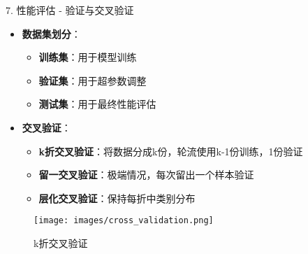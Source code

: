 \documentclass[
  ignorenonframetext,
  aspectratio=169,
  chinese-hans,
]{beamer}
\providecommand{\tightlist}{%
  \setlength{\itemsep}{0pt}\setlength{\parskip}{0pt}}\usepackage{longtable,booktabs,array}
\begin{document}
\begin{frame}{7. 性能评估 - 验证与交叉验证}
\label{ux6027ux80fdux8bc4ux4f30---ux9a8cux8bc1ux4e0eux4ea4ux53c9ux9a8cux8bc1}
\begin{itemize}
\tightlist
\item
  \textbf{数据集划分}：

  \begin{itemize}
  \tightlist
  \item
    \textbf{训练集}：用于模型训练
  \item
    \textbf{验证集}：用于超参数调整
  \item
    \textbf{测试集}：用于最终性能评估
  \end{itemize}
\item
  \textbf{交叉验证}：

  \begin{itemize}
  \tightlist
  \item
    \textbf{k折交叉验证}：将数据分成k份，轮流使用k-1份训练，1份验证
  \item
    \textbf{留一交叉验证}：极端情况，每次留出一个样本验证
  \item
    \textbf{层化交叉验证}：保持每折中类别分布
  \end{itemize}
\end{itemize}

\begin{figure}[H]

{\centering \texttt{[image: images/cross\_validation.png]}

}

\caption{k折交叉验证}

\end{figure}%
\end{frame}
\end{document}
